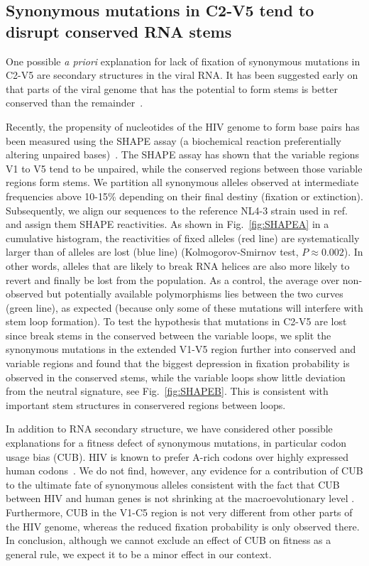 \documentclass[rmp, twocolumn]{revtex4}
\newcommand{\FIG}[1]{Fig.~\ref{fig:#1}}
\begin{document}
\subsection{Synonymous mutations in C2-V5 tend to disrupt conserved RNA stems}

One possible {\it a priori} explanation for lack of fixation of synonymous
mutations in C2-V5 are  secondary structures in the viral RNA. It has
been suggested early on that parts of the viral genome that has the potential to
form stems is better conserved than the
remainder~\citep{forsdyke_reciprocal_1995,snoeck_mapping_2011}.

Recently, the propensity of nucleotides of the HIV genome to form base pairs has
been measured using the SHAPE assay (a biochemical reaction preferentially
altering unpaired bases)~\citep{watts_architecture_2009}. The SHAPE assay has
shown that the variable regions V1 to V5 tend to be unpaired, while the
conserved regions between those variable regions form stems. We partition all
synonymous alleles observed at intermediate frequencies above 10-15\% depending
on their final destiny (fixation or extinction). Subsequently, we align our
sequences to the reference NL4-3 strain used in
ref.~\citep{watts_architecture_2009} and assign them SHAPE reactivities. As
shown in \FIG{SHAPEA} in a cumulative histogram, the reactivities of fixed
alleles (red line) are systematically larger than of alleles are lost (blue
line) (Kolmogorov-Smirnov test, $P\approx 0.002$).
In other words, alleles that are likely to break RNA helices are also more
likely to revert and finally be lost from the population. As a control, the
average over non-observed but potentially available polymorphisms lies between
the two curves (green line), as expected (because only some of these mutations
will interfere with stem loop formation).
To test the hypothesis that mutations in C2-V5 are lost since break stems in the
conserved between the variable loops, we split the synonymous mutations in the
extended V1-V5 region further into conserved and variable regions and found that
the biggest depression in fixation probability is observed in the conserved
stems, while the variable loops show little deviation from the neutral
signature, see \FIG{SHAPEB}. This is consistent with important stem structures
in conservered regions between loops.

In addition to RNA secondary structure, we have considered other possible
explanations for a fitness defect of synonymous mutations, in particular codon
usage bias (CUB). HIV is known to prefer A-rich codons over highly expressed
human codons~\citep{jenkins_extent_2003,kuyl_biased_2012}. We do not find,
however, any evidence for a contribution of CUB to the ultimate fate of
synonymous alleles consistent with the fact that CUB between HIV and human genes
is not shrinking at the macroevolutionary level \citep{kuyl_biased_2012}. 
Furthermore, CUB in the V1-C5 region is not very different from other parts of
the HIV genome, whereas the reduced fixation probability is only observed there. In
conclusion, although we cannot exclude an effect of CUB on fitness as a general
rule, we expect it to be a minor effect in our context. 
\end{document}
